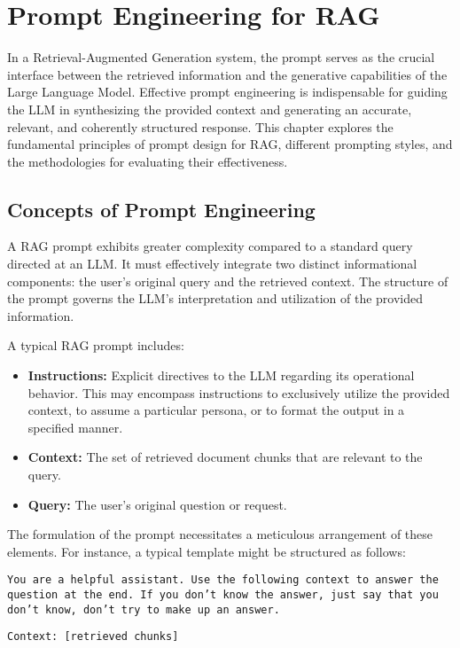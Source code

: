 \chapter{Prompt Engineering for RAG}
\label{chap:prompt_engineering}

In a Retrieval-Augmented Generation system, the prompt serves as the crucial interface between the retrieved information and the generative capabilities of the Large Language Model. Effective prompt engineering is indispensable for guiding the LLM in synthesizing the provided context and generating an accurate, relevant, and coherently structured response. This chapter explores the fundamental principles of prompt design for RAG, different prompting styles, and the methodologies for evaluating their effectiveness.

\section{Concepts of Prompt Engineering}
A RAG prompt exhibits greater complexity compared to a standard query directed at an LLM. It must effectively integrate two distinct informational components: the user's original query and the retrieved context. The structure of the prompt governs the LLM's interpretation and utilization of the provided information.

A typical RAG prompt includes:
\begin{itemize}
    \item \textbf{Instructions:} Explicit directives to the LLM regarding its operational behavior. This may encompass instructions to exclusively utilize the provided context, to assume a particular persona, or to format the output in a specified manner.
    \item \textbf{Context:} The set of retrieved document chunks that are relevant to the query.
    \item \textbf{Query:} The user's original question or request.
\end{itemize}

The formulation of the prompt necessitates a meticulous arrangement of these elements. For instance, a typical template might be structured as follows:

\texttt{You are a helpful assistant. Use the following context to answer the question at the end. If you don't know the answer, just say that you don't know, don't try to make up an answer.}

\texttt{Context: [retrieved chunks]}

